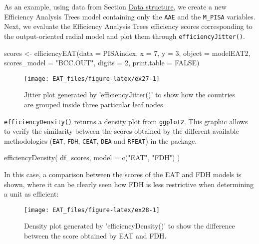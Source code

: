 As an example, using data from Section \protect\hyperlink{section3}{Data
structure}, we create a new Efficiency Analysis Trees model containing
only the \texttt{AAE} and the \texttt{M\_PISA} variables. Next, we
evaluate the Efficiency Analysis Trees efficiency scores corresponding
to the output-oriented radial model and plot them through
\texttt{efficiencyJitter()}.

\begin{Schunk}
\begin{Sinput}
scores <- efficiencyEAT(data = PISAindex, x = 7, y = 3, object = modelEAT2, 
                        scores_model = "BCC.OUT", digits = 2, 
                        print.table = FALSE)
\end{Sinput}
\end{Schunk}

\begin{Schunk}
\begin{figure}

{\centering \texttt{[image: EAT\_files/figure-latex/ex27-1]} 

}

\caption[Jitter plot generated by 'efficiencyJitter()' to show how the countries are grouped inside three particular leaf nodes]{Jitter plot generated by 'efficiencyJitter()' to show how the countries are grouped inside three particular leaf nodes.}\label{fig:ex27}
\end{figure}
\end{Schunk}

\texttt{efficiencyDensity()} returns a density plot from
\texttt{ggplot2}. This graphic allows to verify the similarity between
the scores obtained by the different available methodologies
(\texttt{EAT}, \texttt{FDH}, \texttt{CEAT}, \texttt{DEA} and
\texttt{RFEAT}) in the  package.

\begin{Schunk}
\begin{Sinput}
efficiencyDensity(
  df_scores,
  model = c("EAT", "FDH")
)
\end{Sinput}
\end{Schunk}

In this case, a comparison between the scores of the EAT and FDH models
is shown, where it can be clearly seen how FDH is less restrictive when
determining a unit as efficient:

\begin{Schunk}
\begin{figure}

{\centering \texttt{[image: EAT\_files/figure-latex/ex28-1]} 

}

\caption[Density plot generated by 'efficiencyDensity()' to show the difference between the score obtained by EAT and FDH]{Density plot generated by 'efficiencyDensity()' to show the difference between the score obtained by EAT and FDH.}\label{fig:ex28}
\end{figure}
\end{Schunk}

